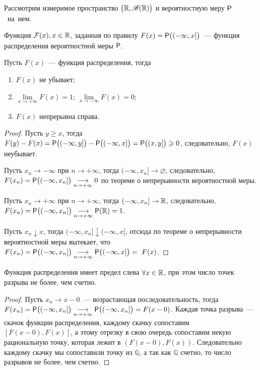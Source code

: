 Рассмотрим измеримое пространство $\big(\R, \B(\R)\big)$ и вероятностную меру $\P$~на~нем.
\begin{definition}
	Функция $\F(x), x \in \R$, заданная по правилу $F(x) = \P \big( (-\infty, x] \big)$~--- функция распределения вероятностной меры  $\P$.
\end{definition}
\begin{lemma}
	Пусть $F(x)$~--- функция распределения, тогда
	\begin{enumerate}
		\item $F(x)$ не убывает;
		\item $\lim\limits_{x \rightarrow +\infty} F(x) = 1$; $\lim\limits_{x \rightarrow -\infty} F(x) = 0$;
		\item $F(x)$ непрерывна справа.
	\end{enumerate}
	\begin{proof}
		Пусть $y \geqslant x$, тогда $F(y) - F(x) = \P \big( (-\infty, y] \big) - \P \big( (-\infty, x] \big) = \P \big( (x, y] \big) \geqslant 0$, следовательно, $F(x)$ неубывает.
		
		Пусть $x_n \rightarrow -\infty$ при $n \rightarrow +\infty$, тогда $(-\infty, x_n] \rightarrow \varnothing$, следовательно, $F(x_n) = \P \big( (-\infty, x_n] \big) \underset{n \rightarrow +\infty}{\longrightarrow} 0$ по теореме о непрерывности вероятностной меры. 
		
		Пусть $x_n \rightarrow +\infty$ при $n \rightarrow +\infty$, тогда $(-\infty, x_n] \rightarrow \R$, следовательно, $F(x_n) = \P \big( (-\infty, x_n] \big) \underset{n \rightarrow +\infty}{\longrightarrow} \P(\R) = 1$.
				
		Пусть $x_n \downarrow x$, тогда $(-\infty, x_n] \downarrow (-\infty, x]$, отсюда по теореме о непрерывности вероятностной меры вытекает, что $F(x_n) = \P \big( (-\infty, x_n] \big) \underset{n \rightarrow +\infty}{\longrightarrow} \P \big( (-\infty, x] \big) =~F(x)$.
	\end{proof}
\end{lemma}
\begin{property}
	Функция распределения имеет предел слева $\forall x \in \R$, при этом число точек разрыва не более, чем счетно.
	\begin{proof}
		Пусть $x_n \rightarrow x - 0$~--- возрастающая последовательность, тогда $F(x_n) = \P \big( (-\infty, x_n] \big) \underset{n \rightarrow +\infty}{\longrightarrow} \P \big( (-\infty, x_n] \big) = F(x - 0)$. Каждая точка разрыва~--- скачок функции распределения, каждому скачку сопоставим $[F(x-0), F(x)]$, а этому отрезку в свою очередь сопоставим некую рациональную точку, которая лежит в $(F(x-0), F(x))$. Следовательно каждому скачку мы сопоставили точку из $\mathbb{Q}$, а так как $\mathbb{Q}$ счетно, то число разрывов не более, чем счетно.
	\end{proof}
\end{property}
